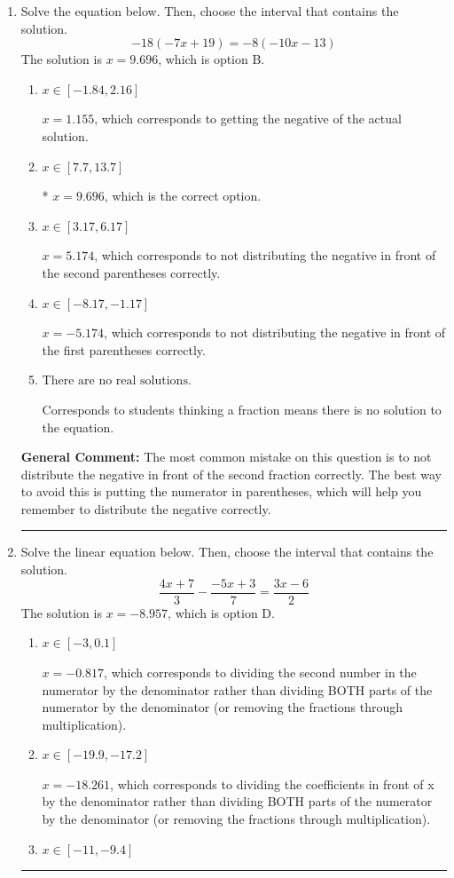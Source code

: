 \documentclass{extbook}[14pt]
\newcommand{\litem}[1]{\item #1

\rule{\textwidth}{0.4pt}}
\begin{document}
\begin{enumerate}\litem{
Solve the equation below. Then, choose the interval that contains the solution.
\[ -18(-7x + 19) = -8(-10x -13) \]The solution is \( x = 9.696 \), which is option B.\begin{enumerate}[label=\Alph*.]
\item \( x \in [-1.84, 2.16] \)

$x = 1.155$, which corresponds to getting the negative of the actual solution.
\item \( x \in [7.7, 13.7] \)

* $x = 9.696$, which is the correct option.
\item \( x \in [3.17, 6.17] \)

$x = 5.174$, which corresponds to not distributing the negative in front of the second parentheses correctly.
\item \( x \in [-8.17, -1.17] \)

$x = -5.174$, which corresponds to not distributing the negative in front of the first parentheses correctly.
\item \( \text{There are no real solutions.} \)

Corresponds to students thinking a fraction means there is no solution to the equation.
\end{enumerate}

\textbf{General Comment:} The most common mistake on this question is to not distribute the negative in front of the second fraction correctly. The best way to avoid this is putting the numerator in parentheses, which will help you remember to distribute the negative correctly.
}
\litem{
Solve the linear equation below. Then, choose the interval that contains the solution.
\[ \frac{4x + 7}{3} - \frac{-5x + 3}{7} = \frac{3x -6}{2} \]The solution is \( x = -8.957 \), which is option D.\begin{enumerate}[label=\Alph*.]
\item \( x \in [-3, 0.1] \)

 $x = -0.817$, which corresponds to dividing the second number in the numerator by the denominator rather than dividing BOTH parts of the numerator by the denominator (or removing the fractions through multiplication).
\item \( x \in [-19.9, -17.2] \)

 $x = -18.261$, which corresponds to dividing the coefficients in front of x by the denominator rather than dividing BOTH parts of the numerator by the denominator (or removing the fractions through multiplication).
\item \( x \in [-11, -9.4] \)


\end{enumerate}}
\end{enumerate}
\end{document}
